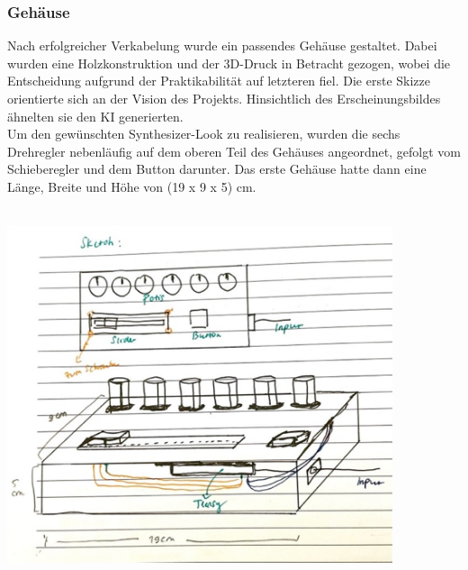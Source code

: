 \documentclass[12pt]{scrartcl}%
\theoremstyle{nonumberplain}
\begin{document}
\newpage

\subsubsection{Gehäuse}

\noindent Nach erfolgreicher Verkabelung wurde ein passendes Gehäuse gestaltet. Dabei wurden eine Holzkonstruktion und der 3D-Druck in Betracht gezogen, wobei die Entscheidung aufgrund der Praktikabilität auf letzteren fiel. Die erste Skizze orientierte sich an der Vision des Projekts. Hinsichtlich des Erscheinungsbildes ähnelten sie den KI generierten.\\
Um den gewünschten Synthesizer-Look zu realisieren, wurden die sechs Drehregler nebenläufig auf dem oberen Teil des Gehäuses angeordnet, gefolgt vom Schieberegler und dem Button darunter. Das erste Gehäuse hatte dann eine Länge, Breite und Höhe von (19 x 9 x 5) cm.\\\\
\begin{minipage}[t]{0.5\textwidth}
\centering
\includegraphics[width=0.85\textwidth]{hw_1}
\end{minipage}
\end{document}
